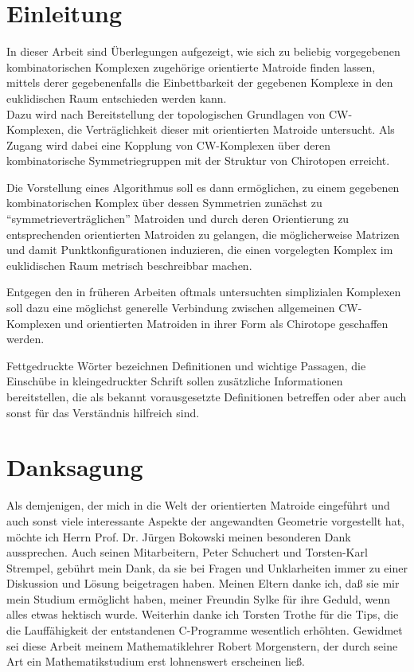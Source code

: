 \section*{Einleitung}

In dieser Arbeit sind Überlegungen aufgezeigt, wie sich zu beliebig
vorgegebenen kombinatorischen Komplexen zugehörige orientierte Matroide
finden lassen, mittels derer gegebenenfalls die Einbettbarkeit der
gegebenen Komplexe in den euklidischen Raum entschieden werden kann.\\
Dazu wird nach Bereitstellung der topologischen Grundlagen von CW-Komplexen, die
Verträglichkeit dieser mit orientierten Matroide untersucht. Als Zugang wird
dabei eine Kopplung von CW-Komplexen über deren kombinatorische
Symmetriegruppen mit der Struktur von Chirotopen erreicht.

Die Vorstellung eines Algorithmus soll es dann ermöglichen, zu einem gegebenen
kombinatorischen Komplex über dessen Symmetrien zunächst zu
"`symmetriever\-träg\-lichen"' Matroiden und durch deren Orientierung zu
entsprechenden orientierten Matroiden zu gelangen, die möglicherweise
Matrizen und damit Punktkonfigurationen induzieren, die einen vorgelegten
Komplex im euklidischen Raum metrisch beschreibbar machen.

Entgegen den in früheren Arbeiten oftmals untersuchten simplizialen Komplexen
soll dazu eine möglichst generelle Verbindung zwischen allgemeinen CW-Komplexen
und orientierten Matroiden in ihrer Form als Chirotope geschaffen werden.

Fettgedruckte Wörter bezeichnen Definitionen und wichtige Passagen, die
Einschübe in kleingedruckter Schrift sollen zusätzliche Informationen
bereitstellen, die als bekannt vorausgesetzte Definitionen betreffen oder
aber auch sonst für das Verständnis hilfreich sind.

\section*{Danksagung}

Als demjenigen, der mich in die Welt der orientierten Matroide eingeführt
und auch sonst viele interessante Aspekte der angewandten Geometrie vorgestellt
hat, möchte ich Herrn Prof. Dr. Jürgen Bokowski meinen besonderen Dank
aussprechen. Auch seinen Mitarbeitern, Peter Schuchert und Torsten-Karl Strempel,
gebührt mein Dank, da sie bei Fragen und Unklarheiten immer zu einer
Diskussion und Lösung beigetragen haben. Meinen Eltern danke ich, daß sie
mir mein Studium ermöglicht haben, meiner Freundin Sylke für ihre Geduld,
wenn alles etwas hektisch wurde. Weiterhin danke ich Torsten Trothe für die
Tips, die die Lauffähigkeit der entstandenen C-Programme wesentlich erhöhten.
Gewidmet sei diese Arbeit meinem Mathematiklehrer Robert Morgenstern, der
durch seine Art ein Mathematikstudium erst lohnenswert erscheinen ließ.





\nocite{Hof:91}



\listoffigures
\printindex

